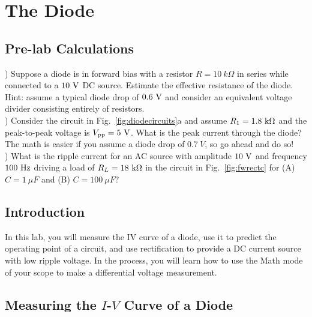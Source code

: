 \chapter{The Diode}

\section{Pre-lab Calculations}
) Suppose a diode is in forward bias with a resistor $R=10~k\Omega$ in series while connected to a $10~\rm V$ DC source.  Estimate the effective resistance of the diode.  Hint: assume a typical diode drop of $0.6~\rm V$ and consider an equivalent voltage divider consisting entirely of resistors. \\ 

) Consider the circuit in Fig.~\ref{fig:diodecircuits}a and assume $R_1=1.8~\rm k \Omega$ and the peak-to-peak voltage is $V_{\rm pp} = 5~\rm V$.  What is the peak current through the diode?  The math is easier if you assume a diode drop of $0.7~V$, so go ahead and do so! \\

) What is the ripple current for an AC source with amplitude $10~\rm V$ and frequency $100~\rm Hz$ driving a load of $R_L=18~\rm k\Omega$ in the circuit in Fig.~\ref{fig:fwrectc} for (A) $C=1~\mu F$ and (B) $C=100~\mu F$?

\section{Introduction}

In this lab, you will measure the IV curve of a diode, use it to predict the operating point of a circuit, and use rectification to provide a DC current source with low ripple voltage.   In the process, you will learn how to use the Math mode of your scope to make a differential voltage measurement.

\section{Measuring the $I$-$V$ Curve of a Diode}

